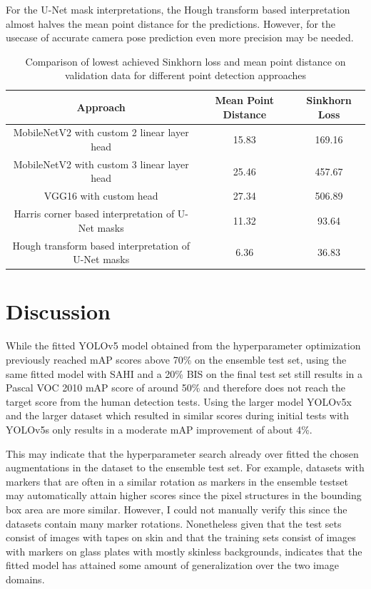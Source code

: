 \documentclass[10pt]{book}
\begin{document}
For the U-Net mask interpretations, the Hough transform based interpretation almost halves the mean point distance for the predictions. However, for the usecase of accurate camera pose prediction even more precision may be needed.

\begin{table}
  \begin{tabular}{ c c c }
   Approach & Mean Point Distance & Sinkhorn Loss \\ 
   \hline
   MobileNetV2 with custom 2 linear layer head & 15.83 & 169.16 \\
   MobileNetV2 with custom 3 linear layer head & 25.46 & 457.67 \\
   VGG16 with custom head & 27.34 & 506.89 \\
   Harris corner based interpretation of U-Net masks & 11.32 & 93.64 \\
   Hough transform based interpretation of U-Net masks & 6.36 & 36.83 \\
   \hline
  \end{tabular}
  \caption{\label{tab:pet_valdata_results}Comparison of lowest achieved Sinkhorn loss and mean point distance on validation data for different point detection approaches}  %
\end{table}

\section{Discussion}

While the fitted \ac{YOLO}v5 model obtained from the hyperparameter optimization previously reached \ac{mAP} scores above 70\% on the ensemble test set, using the same fitted model with \ac{SAHI} and a 20\% \ac{BIS} on the final test set still results in a Pascal VOC 2010 \ac{mAP} score of around 50\% and therefore does not reach the target score from the human detection tests. Using the larger model \ac{YOLO}v5x and the larger dataset which resulted in similar scores during initial tests with \ac{YOLO}v5s only results in a moderate \ac{mAP} improvement of about 4\%.

This may indicate that the hyperparameter search already over fitted the chosen augmentations in the dataset to the ensemble test set. For example, datasets with markers that are often in a similar rotation as markers in the ensemble testset may automatically attain higher scores since the pixel structures in the bounding box area are more similar. However, I could not manually verify this since the datasets contain many marker rotations. %
Nonetheless given that the test sets consist of images with tapes on skin and that the training sets consist of images with markers on glass plates with mostly skinless backgrounds, indicates that the fitted model has attained some amount of generalization over the two image domains.
\end{document}

